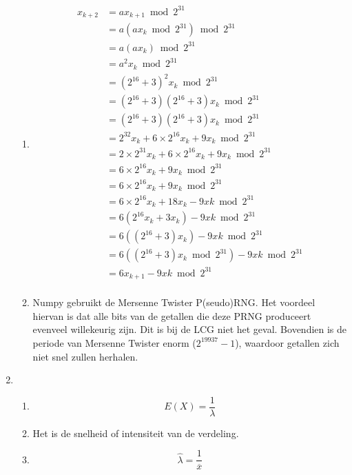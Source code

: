 \documentclass{article}
\begin{document}
\begin{enumerate}
\begin{enumerate}[1.]
            \item
                \newcommand{\modd}{\bmod 2^{31}}
                \begin{align*}
                    x_{k+2} &= ax_{k+1}  \modd \\
                            &= a(ax_k\modd)  \modd\\
                            &= a(ax_k)  \modd\\
                            &= a^2x_k  \modd\\
                            &= (2^{16} + 3)^2x_k  \modd\\
                            &= (2^{16} + 3)(2^{16} + 3)x_k  \modd\\
                            &= (2^{16} + 3)(2^{16} + 3)x_k  \modd\\
                            &= 2^{32}x_k + 6\times2^{16}x_k + 9x_k  \modd\\
                            &= 2\times2^{31}x_k + 6\times2^{16}x_k + 9x_k  \modd\\
                            &= 6\times2^{16}x_k + 9x_k  \modd\\
                            &= 6\times2^{16}x_k + 9x_k  \modd\\
                            &= 6\times2^{16}x_k + 18x_k - 9xk  \modd\\
                            &= 6(2^{16}x_k + 3x_k) - 9xk  \modd\\
                            &= 6((2^{16} + 3)x_k) - 9xk  \modd\\
                            &= 6((2^{16} + 3)x_k \modd) - 9xk  \modd\\
                            &= 6x_{k+1} - 9xk  \modd\\
                \end{align*}

            \item
                Numpy gebruikt de Mersenne Twister P(seudo)RNG. Het voordeel
                hiervan is dat alle bits van de getallen die deze PRNG
                produceert evenveel willekeurig zijn. Dit is bij de LCG niet het
                geval. Bovendien is de periode van Mersenne Twister enorm
                ($2^{19937}-1$), waardoor getallen zich niet snel zullen
                herhalen.

        \end{enumerate}

    \item
        \begin{enumerate}[1.]
            \item
                $$E(X) = \frac1{\lambda}$$

            \item
                Het is de snelheid of intensiteit van de verdeling.

            \item
                $$\widehat{\lambda}=\frac1{\overline{x}}$$

        \end{enumerate}

\end{enumerate}
\end{document}
